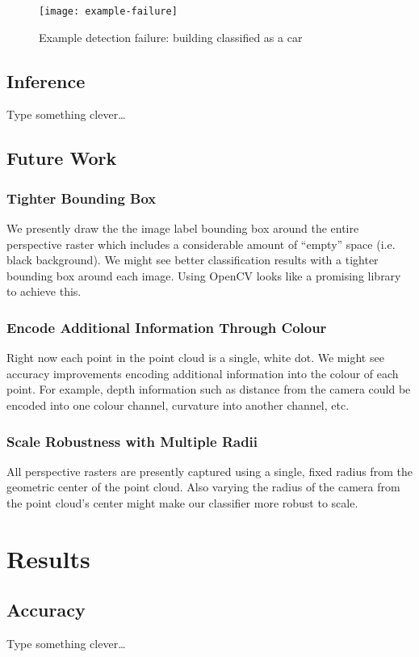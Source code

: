\documentclass[runningheads,a4paper]{llncs}
\begin{document}
\begin{figure}[h]
  \caption{Example detection failure: building classified as a car}
  \centering
  \texttt{[image: example-failure]}
  \label{fig:example-failure}
\end{figure}

\subsection{Inference}
Type something clever\dots

\subsection{Future Work}
\subsubsection{Tighter Bounding Box}
We presently draw the the image label bounding box around the entire perspective
raster which includes a considerable amount of “empty” space (i.e. black
background). We might see better classification results with a tighter bounding
box around each image. Using OpenCV looks like a promising library to achieve
this.

\subsubsection{Encode Additional Information Through Colour}
Right now each point in the point cloud is a single, white dot. We might see
accuracy improvements encoding additional information into the colour of each
point. For example, depth information such as distance from the camera could be
encoded into one colour channel, curvature into another channel, etc.

\subsubsection{Scale Robustness with Multiple Radii}
All perspective rasters are presently captured using a single, fixed radius
from the geometric center of the point cloud. Also varying the radius of the
camera from the point cloud’s center might make our classifier more robust to
scale. 

\section{Results}
\subsection{Accuracy}
Type something clever\dots
\end{document}

